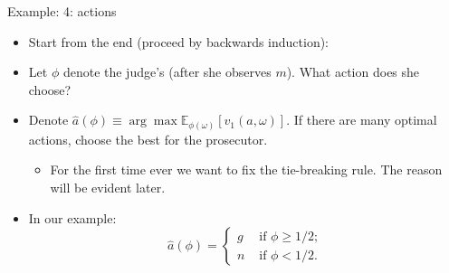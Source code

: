 \documentclass[english,10pt
,aspectratio=169
]{beamer}
\begin{document}
\begin{frame}{Example: 4: actions}
\begin{itemize}
	\item Start from the end (proceed by backwards induction):
	\item Let $\phi$ denote the judge's  (after she observes $m$). What action does she choose?
	\item Denote $\hat{a}(\phi) \equiv \arg \max \mathbb{E}_{\phi(\omega)} [v_1(a,\omega)]$. If there are many optimal actions, choose the best for the prosecutor.
	\begin{itemize}
		\item For the first time ever we want to fix the tie-breaking rule. The reason will be evident later.
	\end{itemize}
	\pause
	\item In our example:
	\begin{equation*}
		\hat{a}(\phi) = \begin{cases}
			g & \text{ if } \phi \geq 1/2;
			\\
			n & \text{ if } \phi < 1/2.
		\end{cases}
	\end{equation*}
\end{itemize}
\end{frame}
\end{document}
